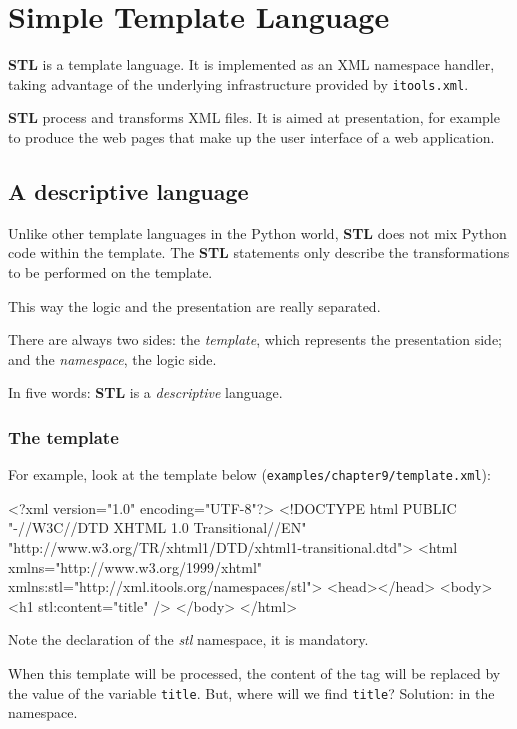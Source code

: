 \chapter{Simple Template Language}
\label{Chapter: STL}

{\bf STL} is a template language. It is implemented as an XML namespace
handler, taking advantage of the underlying infrastructure provided by
{\tt itools.xml}.

{\bf STL} process and transforms XML files. It is aimed at presentation,
for example to produce the web pages that make up the user interface of
a web application.


\section{A descriptive language}

Unlike other template languages in the Python world, {\bf STL} does not
mix Python code within the template. The {\bf STL} statements only describe
the transformations to be performed on the template.

This way the logic and the presentation are really separated.

There are always two sides: the {\em template}, which represents the
presentation side; and the {\em namespace}, the logic side.

In five words: {\bf STL} is a {\em descriptive} language.

\subsection{The template}

For example, look at the template below ({\tt examples/chapter9/template.xml}):

\begin{code}
    <?xml version="1.0" encoding="UTF-8"?>
    <!DOCTYPE html
         PUBLIC "-//W3C//DTD XHTML 1.0 Transitional//EN"
         "http://www.w3.org/TR/xhtml1/DTD/xhtml1-transitional.dtd">
    <html xmlns="http://www.w3.org/1999/xhtml"
          xmlns:stl="http://xml.itools.org/namespaces/stl">
      <head></head>
      <body>
        <h1 stl:content="title" />
      </body>
    </html>
\end{code}

Note the declaration of the {\em stl} namespace, it is mandatory.

When this template will be processed, the content of the {\tt <h1>} tag
will be replaced by the value of the variable {\tt title}. But, where will
we find {\tt title}? Solution: in the namespace.


